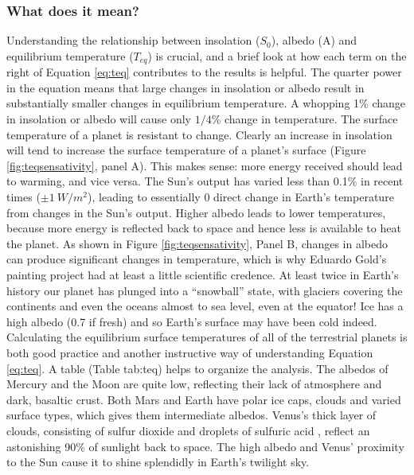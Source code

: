\subsubsection{What does it mean?}
Understanding the relationship between insolation ($S_0$), albedo (A) and equilibrium temperature ($T_{eq}$) is crucial, and a brief look at how each term on the right of Equation \ref{eq:teq} contributes to the results is helpful. The quarter power in the equation means that large changes in insolation or albedo result in substantially smaller changes in equilibrium temperature. A whopping 1\% change in insolation or albedo will cause only $1/4$\% change in temperature. The surface temperature of a planet is resistant to change. Clearly an increase in insolation will tend to increase the surface temperature of a planet's surface (Figure \ref{fig:teqsensativity}, panel A). This makes sense: more energy received should lead to warming, and vice versa. The Sun's output has varied less than 0.1\% in recent times ($\pm \SI{1}{W/m^2}$), leading to essentially 0 direct change in Earth's temperature from changes in the Sun's output. Higher albedo leads to lower temperatures, because more energy is reflected back to space and hence less is available to heat the planet. As shown in Figure \ref{fig:teqsensativity}, Panel B, changes in albedo can produce significant changes in temperature, which is why Eduardo Gold's painting project had at least a little scientific credence. At least twice in Earth's history our planet has plunged into a ``snowball'' state, with glaciers covering the continents and even the oceans almost to sea level, even at the equator! Ice has a high albedo (0.7 if fresh) and so Earth's surface may have been cold indeed.\\
Calculating the equilibrium surface temperatures of all of the terrestrial planets is both good practice and another instructive way of understanding Equation \ref{eq:teq}. A table (Table {tab:teq}) helps to organize the analysis. The albedos of Mercury and the Moon are quite low, reflecting their lack of atmosphere and dark, basaltic crust. Both Mars and Earth have polar ice caps, clouds and varied surface types, which gives them intermediate albedos. Venus's thick layer of clouds, consisting of sulfur dioxide and droplets of sulfuric acid , reflect an astonishing 90\% of sunlight back to space. The high albedo and Venus' proximity to the Sun cause it to shine splendidly in Earth's twilight sky.
